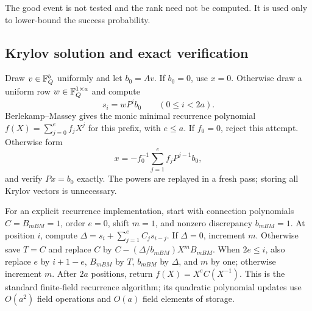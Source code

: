 The good event is not tested and the rank need not be computed.
It is used only to lower-bound the success probability.

\subsection{Krylov solution and exact verification}

Draw $v\in\mathbb F_Q^b$ uniformly and let $b_0=Av$.
If $b_0=0$, use $x=0$.
Otherwise draw a uniform row $w\in\mathbb F_Q^{1\times a}$ and compute
\[
 s_i=wP^ib_0\qquad(0\le i<2a).
\]
Berlekamp--Massey gives the monic minimal recurrence polynomial
$f(X)=\sum_{j=0}^e f_jX^j$ for this prefix, with $e\le a$.
If $f_0=0$, reject this attempt.  Otherwise form
\begin{equation}
 x=-f_0^{-1}\sum_{j=1}^e f_jP^{j-1}b_0,
 \label{rf:krylovsolve}
\end{equation}
and verify $Px=b_0$ exactly.  The powers are replayed in a fresh
pass; storing all Krylov vectors is unnecessary.

For an explicit recurrence implementation, start with connection
polynomials $C=B_{
m BM}=1$, order $e=0$, shift $m=1$, and
nonzero discrepancy $b_{
m BM}=1$.  At position $i$, compute
$\Delta=s_i+\sum_{j=1}^e C_js_{i-j}$.
If $\Delta=0$, increment $m$.
Otherwise save $T=C$ and replace
$C$ by $C-(\Delta/b_{
m BM})X^mB_{
m BM}$.
When $2e\le i$, also replace
$e$ by $i+1-e$, $B_{
m BM}$ by $T$,
$b_{
m BM}$ by $\Delta$, and $m$ by one;
otherwise increment $m$.
After $2a$ positions, return $f(X)=X^eC(X^{-1})$.
This is the standard finite-field recurrence algorithm; its
quadratic polynomial updates use $O(a^2)$ field operations and
$O(a)$ field elements of storage.

